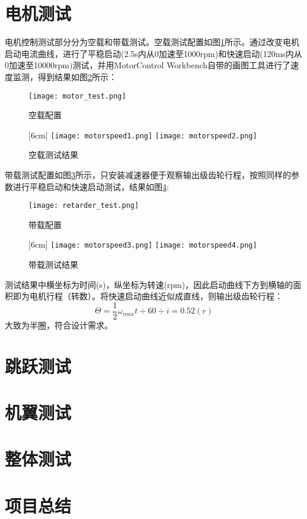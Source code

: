 \section{电机测试}
电机控制测试部分分为空载和带载测试。空载测试配置如图\ref{fig:motor_test}所示。通过改变电机启动电流曲线，进行了平稳启动(2.5s内从0加速至1000rpm)和快速启动(120ms内从0加速至10000rpm)测试，并用MotorControl Workbench自带的画图工具进行了速度监测，得到结果如图\ref{fig:motor_test_speed}所示：

\begin{figure}[H]
  \centering%
  \texttt{[image: motor\_test.png]}
  \caption{空载配置}
  \label{fig:motor_test}
\end{figure}
\begin{figure}[H]
  \centering
  [6cm] 
    {\texttt{[image: motorspeed1.png]}}
  \hspace{4em}
      {\texttt{[image: motorspeed2.png]}}
  \caption{空载测试结果}
  \label{fig:motor_test_speed}
\end{figure}
带载测试配置如图\ref{fig:retarder_test}所示，只安装减速器便于观察输出级齿轮行程，按照同样的参数进行平稳启动和快速启动测试，结果如图\ref{fig:retarder_test_speed}:
\begin{figure}[H]
  \centering%
  \texttt{[image: retarder\_test.png]}
  \caption{带载配置}
  \label{fig:retarder_test}
\end{figure}
\begin{figure}[H]
  \centering
  [6cm] 
    {\texttt{[image: motorspeed3.png]}}
  \hspace{4em}
      {\texttt{[image: motorspeed4.png]}}
  \caption{带载测试结果}
  \label{fig:retarder_test_speed}
\end{figure}
测试结果中横坐标为时间(s)，纵坐标为转速(rpm)，因此启动曲线下方到横轴的面积即为电机行程（转数）。将快速启动曲线近似成直线，则输出级齿轮行程：$$\Theta=\frac{1}{2}\omega_{max}t\div60\div i=0.52(r)$$
大致为半圈，符合设计需求。
\section{跳跃测试}
\section{机翼测试}
\section{整体测试}
\section{项目总结}